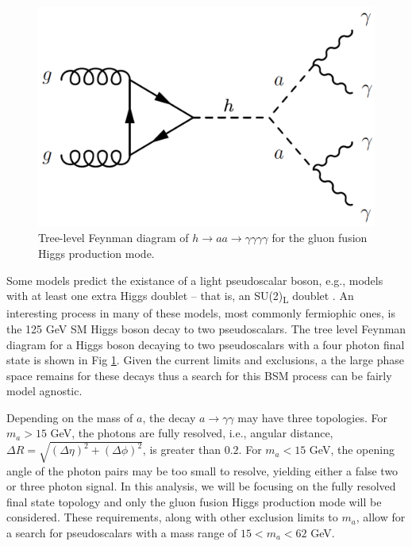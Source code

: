 \documentclass[12pt]{article}
\begin{document}
\begin{figure}
   \centering
   \includegraphics[width=0.45\linewidth]{figures/h4g-feynman-diagram.png}
   \caption{Tree-level Feynman diagram of $h\rightarrow aa \rightarrow \gamma\gamma\gamma\gamma$ for the gluon fusion Higgs production mode.}
   \label{fig:h4g-feynman-diag}
\end{figure}

Some models predict the existance of a light pseudoscalar boson, e.g., models with at least one extra Higgs doublet -- that is, an SU(2)\textsubscript{L} doublet \cite{Curtin_2014}. An interesting process in many of these models, most commonly fermiophic ones, is the 125 GeV SM Higgs boson decay to two pseudoscalars. The tree level Feynman diagram for a Higgs boson decaying to two pseudoscalars with a four photon final state is shown in Fig \ref{fig:h4g-feynman-diag}. Given the current limits and exclusions, a the large phase space remains for these decays thus a search for this BSM process can be fairly model agnostic.\par

Depending on the mass of $a$, the decay $a\rightarrow \gamma\gamma$ may have three topologies. For $m_{a} > 15$ GeV, the photons are fully resolved, i.e., angular distance, $\Delta R = \sqrt{(\Delta \eta)^2 + (\Delta \phi)^2}$, is greater than $0.2$. For $m_{a} < 15$ GeV, the opening angle of the photon pairs may be too small to resolve, yielding either a false two or three photon signal. In this analysis, we will be focusing on the fully resolved final state topology and only the gluon fusion Higgs production mode will be considered. These requirements, along with other exclusion limits to $m_{a}$, allow for a search for pseudoscalars with a mass range of $15 < m_{a} < 62$ GeV.\par
\end{document}
